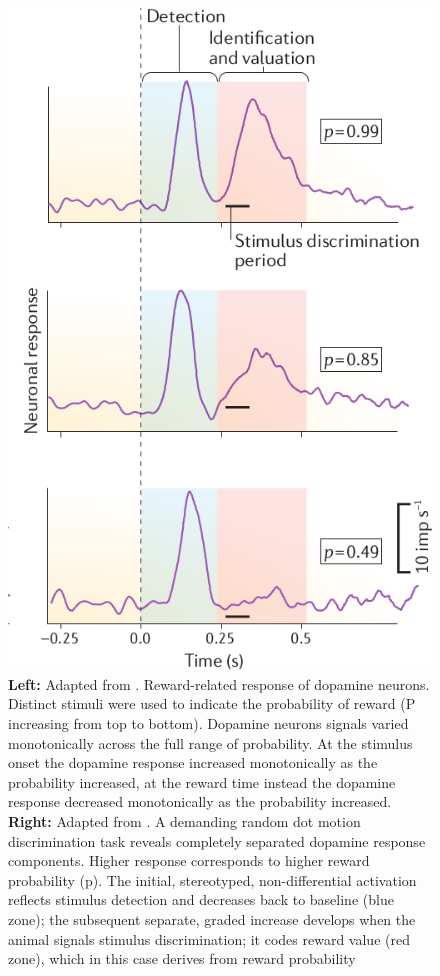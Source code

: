 \begin{figure}[H]
    \includegraphics[scale=0.35]{figures/ResponseProbSchultz.png}
    \caption{\textbf{Left:} Adapted from \cite{Fiorillo}. Reward-related response of dopamine neurons. Distinct stimuli were used to indicate the probability of reward (P increasing from top to bottom). Dopamine neurons signals varied monotonically across the full range of probability. At the stimulus onset the dopamine response increased monotonically as the probability increased, at the reward time instead the dopamine response decreased monotonically as the probability increased. \textbf{Right:} Adapted from \cite{Schultz2016}. A demanding random dot motion discrimination task reveals completely separated dopamine response components. Higher response corresponds to higher reward probability (p). The initial, stereotyped, non-differential activation reflects stimulus detection and decreases back to baseline (blue zone); the subsequent separate, graded increase develops when the animal signals stimulus discrimination; it codes reward value (red zone), which in this case derives from reward probability}
    \label{fig:probDopamine}
\end{figure}
